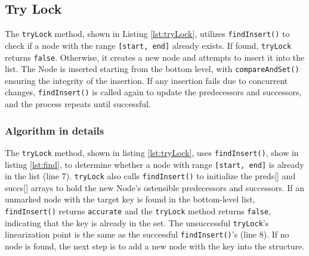 \clearpage

\subsection{Try Lock}\label{subsec:tryLock}

The \texttt{tryLock} method, shown in Listing \ref{lst:tryLock}, utilizes \texttt{findInsert()} to check if a node with the range \texttt{[start, end]} already exists. If found, \texttt{tryLock} returns \texttt{false}. Otherwise, it creates a new node and attempts to insert it into the list. The Node is inserted starting from the bottom level, with \texttt{compareAndSet()} ensuring the integrity of the insertion. If any insertion fails due to concurrent changes, \texttt{findInsert()} is called again to update the predecessors and successors, and the process repeats until successful.

\vspace{15pt}

    
\begin{figure}[h]
    \centering
    
\end{figure}

\subsubsection*{Algorithm in details}
The \texttt{tryLock} method, shown in listing \ref{lst:tryLock}, uses \texttt{findInsert()}, show in listing \ref{lst:find}, to determine whether a node with range \texttt{[start, end]} is already in the list (line 7). \texttt{tryLock} also calls \texttt{findInsert()} to initialize the preds[] and succs[] arrays to hold the new Node's ostensible predecessors and successors.
If an unmarked node with the target key is found in the bottom-level list, \texttt{findInsert()} returns \texttt{accurate} and the \texttt{tryLock} method returns \texttt{false}, indicating that the key is already in the set. The unsuccessful \texttt{tryLock}'s linearization point is the same as the successful \texttt{findInsert()}'s (line 8). If no node is found, the next step is to add a new node with the key into the structure.

